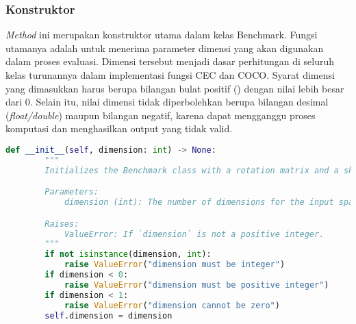 \subsubsection{Konstruktor}
\textit{Method} ini merupakan konstruktor utama dalam kelas Benchmark. Fungsi utamanya adalah untuk menerima parameter dimensi yang akan digunakan dalam proses evaluasi. Dimensi tersebut menjadi dasar perhitungan di seluruh kelas turunannya dalam implementasi fungsi CEC dan COCO. Syarat dimensi yang dimasukkan harus berupa bilangan bulat positif () dengan nilai lebih besar dari 0. Selain itu, nilai dimensi tidak diperbolehkan berupa bilangan desimal (\textit{float/double}) maupun bilangan negatif, karena dapat mengganggu proses komputasi dan menghasilkan output yang tidak valid.
\begin{lstlisting}[language=Python, caption=kontruktor kelas benchmark, label=lst:init_benchmark]
    def __init__(self, dimension: int) -> None:
        """
        Initializes the Benchmark class with a rotation matrix and a shift vector.

        Parameters:
            dimension (int): The number of dimensions for the input space. Must be a positive integer.

        Raises:
            ValueError: If `dimension` is not a positive integer.
        """
        if not isinstance(dimension, int):
            raise ValueError("dimension must be integer")
        if dimension < 0:
            raise ValueError("dimension must be positive integer")
        if dimension < 1:
            raise ValueError("dimension cannot be zero")
        self.dimension = dimension
\end{lstlisting}
